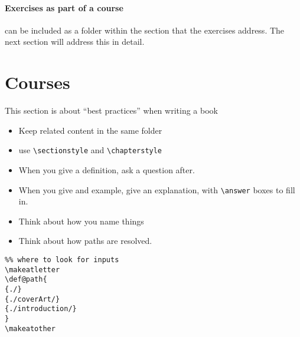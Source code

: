 \documentclass{ximera}
\begin{document}
\paragraph{Exercises as part of a course} can be included as a folder within
the section that the exercises address. The next section will address this in
detail.

    \section{Courses}

    This section is about ``best practices'' when writing a book
    \begin{itemize}
      \item Keep related content in the same folder
      \item use \texttt{\textbackslash sectionstyle} and
            \texttt{\textbackslash chapterstyle}
      \item When you give a definition, ask a question after.
      \item When you give and example, give an explanation, with
            \texttt{\textbackslash answer} boxes to fill in.
      \item Think about how you name things
      \item Think about how paths are resolved.
    \end{itemize}

    \begin{verbatim}
%% where to look for inputs
\makeatletter
\def@path{
{./}
{./coverArt/}
{./introduction/}
}
\makeatother
\end{verbatim}
    \pdfOnly{\end{multicols}}
\end{document}
